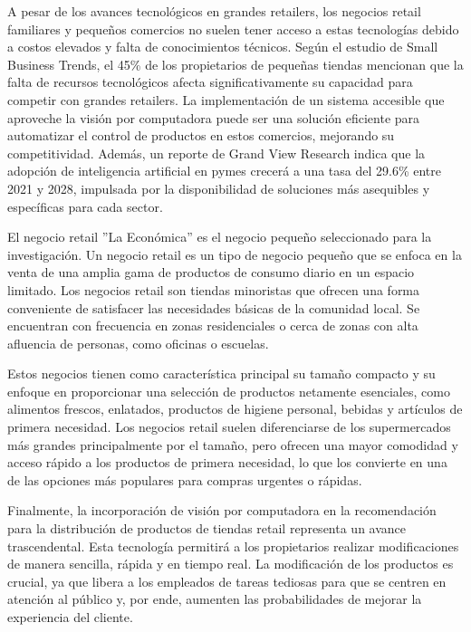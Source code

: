 A pesar de los avances tecnológicos en grandes retailers, los negocios retail familiares y pequeños comercios no suelen tener acceso a estas tecnologías debido a costos elevados y falta de conocimientos técnicos. Según el estudio de Small Business Trends, el 45\% de los propietarios de pequeñas tiendas mencionan que la falta de recursos tecnológicos afecta significativamente su capacidad para competir con grandes retailers. La implementación de un sistema accesible que aproveche la visión por computadora puede ser una solución eficiente para automatizar el control de productos en estos comercios, mejorando su competitividad. Además, un reporte de Grand View Research indica que la adopción de inteligencia artificial en pymes crecerá a una tasa del 29.6\% entre 2021 y 2028, impulsada por la disponibilidad de soluciones más asequibles y específicas para cada sector.

El negocio retail ''La Económica'' es el negocio pequeño seleccionado para la investigación. Un negocio retail es un tipo de negocio pequeño que se enfoca en la venta de una amplia gama de productos de consumo diario en un espacio limitado. Los negocios retail son tiendas minoristas que ofrecen una forma conveniente de satisfacer las necesidades básicas de la comunidad local. Se encuentran con frecuencia en zonas residenciales o cerca de zonas con alta afluencia de personas, como oficinas o escuelas.

Estos negocios tienen como característica principal su tamaño compacto y su enfoque en proporcionar una selección de productos netamente esenciales, como alimentos frescos, enlatados, productos de higiene personal, bebidas y artículos de primera necesidad. Los negocios retail suelen diferenciarse de los supermercados más grandes principalmente por el tamaño, pero ofrecen una mayor comodidad y acceso rápido a los productos de primera necesidad, lo que los convierte en una de las opciones más populares para compras urgentes o rápidas.

Finalmente, la incorporación de visión por computadora en la recomendación para la distribución de productos de tiendas retail representa un avance trascendental. Esta tecnología permitirá a los propietarios realizar modificaciones de manera sencilla, rápida y en tiempo real. La modificación de los productos es crucial, ya que libera a los empleados de tareas tediosas para que se centren en atención al público y, por ende, aumenten las probabilidades de mejorar la experiencia del cliente.





